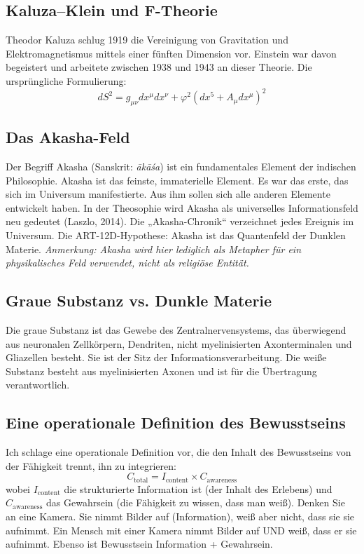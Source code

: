 \documentclass[11pt,a4paper]{article}
\begin{document}
\subsection{Kaluza--Klein und F-Theorie}
Theodor Kaluza schlug 1919 die Vereinigung von Gravitation und Elektromagnetismus mittels einer fünften Dimension vor. Einstein war davon begeistert und arbeitete zwischen 1938 und 1943 an dieser Theorie. Die ursprüngliche Formulierung:
\begin{equation}
dS^2 = g_{\mu\nu} dx^\mu dx^\nu + \varphi^2(dx^5 + A_{\mu} dx^\mu)^2
\end{equation}

\subsection{Das Akasha-Feld}
Der Begriff Akasha (Sanskrit: \emph{ākāśa}) ist ein fundamentales Element der indischen Philosophie. Akasha ist das feinste, immaterielle Element. Es war das erste, das sich im Universum manifestierte. Aus ihm sollen sich alle anderen Elemente entwickelt haben. In der Theosophie wird Akasha als universelles Informationsfeld neu gedeutet (Laszlo, 2014). Die „Akasha-Chronik`` verzeichnet jedes Ereignis im Universum. Die ART-12D-Hypothese: Akasha ist das Quantenfeld der Dunklen Materie. \textit{Anmerkung: Akasha wird hier lediglich als Metapher für ein physikalisches Feld verwendet, nicht als religiöse Entität.}

\subsection{Graue Substanz vs. Dunkle Materie}
Die graue Substanz ist das Gewebe des Zentralnervensystems, das überwiegend aus neuronalen Zellkörpern, Dendriten, nicht myelinisierten Axonterminalen und Gliazellen besteht. Sie ist der Sitz der Informationsverarbeitung. Die weiße Substanz besteht aus myelinisierten Axonen und ist für die Übertragung verantwortlich.

\subsection{Eine operationale Definition des Bewusstseins}
Ich schlage eine operationale Definition vor, die den Inhalt des Bewusstseins von der Fähigkeit trennt, ihn zu integrieren:
\begin{equation}
C_{\text{total}} = I_{\text{content}} \times C_{\text{awareness}}
\end{equation}
wobei $I_{\text{content}}$ die strukturierte Information ist (der Inhalt des Erlebens) und $C_{\text{awareness}}$ das Gewahrsein (die Fähigkeit zu wissen, dass man weiß). Denken Sie an eine Kamera. Sie nimmt Bilder auf (Information), weiß aber nicht, dass sie sie aufnimmt. Ein Mensch mit einer Kamera nimmt Bilder auf UND weiß, dass er sie aufnimmt. Ebenso ist Bewusstsein Information + Gewahrsein.
\end{document}
